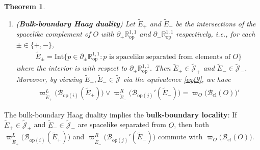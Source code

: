 \documentclass[11pt,b5paper,notitlepage]{article}
\theoremstyle{definition}
\theoremstyle{plain}
\newtheorem{thm}[df]{Theorem}
\newcommand{\wtd}{\widetilde}
\newcommand{\ovl}{\overline}
\newcommand{\Jtd}{\widetilde{\mathcal J}}
\newcommand{\Int}{\mathrm{Int}}
\newcommand{\Rop}{\mathbb R^{1,1}_{\mathrm{op}}}
\newcommand{\Bcl}{\mathcal B_{\mathrm{cl}}}
\newcommand{\Ucl}{U_{\mathrm{cl}}}
\newcommand{\Bopi}{\mathcal B_{\mathrm{op}(i)}}
\newcommand{\Bopj}{\mathcal B_{\mathrm{op}(j)}}
\numberwithin{equation}{section}
\begin{document}
\begin{thm}
\begin{enumerate}[label=(\arabic*),start=2]
\begin{align*}
U_{i\boxtimes\ovl j}(g)\varpi_{O}(A)U_{i\boxtimes\ovl j}(g)^*=\varpi_{(g,g)O}(\Ucl(g,g)A\Ucl(g,g)^*)
\end{align*}
\item (\textbf{Bulk-boundary Haag duality}) Let $\wtd E_+$ and $\wtd E_-$ be the intersections of the spacelike complement of $O$ with $\partial_+\Rop$ and $\partial_-\Rop$ respectively, i.e., for each $\pm\in\{+,-\}$,
\begin{gather*}
\wtd E_\pm=\Int\{p\in\partial_\pm\Rop:p\text{ is spacelike separated from elements of }O\}
\end{gather*}
where the interior is with respect to $\partial_\pm\Rop$. Then $\wtd E_+\in\Jtd_+$ and $\wtd E_-\in\Jtd_-$. Moreover, by viewing $\wtd E_+,\wtd E_-\in\Jtd$ via the equivalence \eqref{eq49}, we have
\begin{align*}
\varpi^L_{\wtd E_+}\big(\Bopi(\wtd E_+)\big)\vee \varpi^R_{\wtd E_-}\big(\Bopj'(\wtd E_-)\big)=\varpi_{O}\big(\Bcl(O)\big)'
\end{align*}
\end{enumerate}
\end{thm}

The bulk-boundary Haag duality implies the \textbf{bulk-boundary locality}: If $\wtd E_+\in\Jtd_+$ and $\wtd E_-\in\Jtd_-$ are spacelike separated from $O$, then both $\varpi^L_{\wtd E_+}\big(\Bopi(\wtd E_+)\big)$ and $\varpi^R_{\wtd E_-}\big(\Bopj'(\wtd E_-)\big)$ commute with $\varpi_O\big(\Bcl(O)\big)$.
\end{document}
